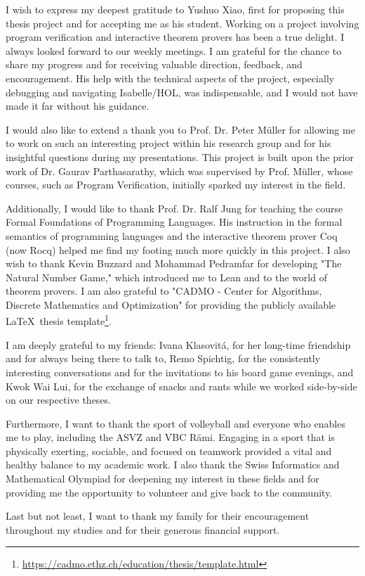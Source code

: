 I wish to express my deepest gratitude to Yushuo Xiao,
first for proposing this thesis project and for accepting me as his student.
Working on a project involving program verification and interactive theorem provers has been a true delight.
I always looked forward to our weekly meetings.
I am grateful for the chance to share my progress and for receiving valuable direction, feedback, and encouragement.
His help with the technical aspects of the project,
especially debugging and navigating Isabelle/HOL, was indispensable,
and I would not have made it far without his guidance.

I would also like to extend a thank you to Prof. Dr. Peter Müller for allowing me to work on such an interesting project
within his research group and for his insightful questions during my presentations.
This project is built upon the prior work of Dr. Gaurav Parthasarathy,
which was supervised by Prof. Müller, whose courses,
such as Program Verification, initially sparked my interest in the field.

Additionally, I would like to thank Prof. Dr. Ralf Jung for teaching the course Formal Foundations of Programming Languages.
His instruction in the formal semantics of programming languages and the interactive theorem prover Coq (now Rocq) helped me find my footing much more quickly in this project.
I also wish to thank Kevin Buzzard and Mohammad Pedramfar for developing "The Natural Number Game,"
which introduced me to Lean and to the world of theorem provers.
I am also grateful to "CADMO - Center for Algorithms, Discrete Mathematics and Optimization" for providing the publicly available \LaTeX\ thesis template\footnote{\url{https://cadmo.ethz.ch/education/thesis/template.html}}.

I am deeply grateful to my friends: Ivana Klasovitá, for her long-time friendship 
and for always being there to talk to,
Remo Spichtig, for the consistently interesting conversations and for the invitations to his board game evenings,
and Kwok Wai Lui, for the exchange of snacks and rants while we worked side-by-side on our respective theses.

Furthermore, I want to thank the sport of volleyball and everyone who enables me to play, including the ASVZ and VBC Rämi.
Engaging in a sport that is physically exerting, sociable, and focused on teamwork provided a vital and healthy balance to my academic work.
I also thank the Swiss Informatics and Mathematical Olympiad for deepening my interest in these fields and for providing me the opportunity to volunteer and give back to the community.

Last but not least, I want to thank my family for their encouragement throughout my studies and for their generous financial support.